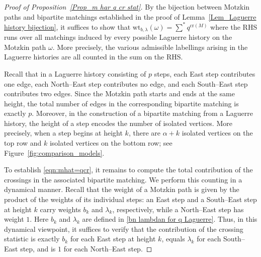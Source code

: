\documentclass{amsart}
\newcommand{\Cr}{\mathrm{cr}}
\theoremstyle{plain}
\theoremstyle{remark}
\numberwithin{equation}{section}
\begin{document}
\begin{proof}[Proof of Proposition~\ref{Prop_m har q cr stat}]
    By the bijection between Motzkin paths and bipartite matchings established in the proof of Lemma~\ref{Lem_Laguerre history bijection}, it suffices to show that $\mathrm{wt}_{b,\lambda}(\omega)=\sum^* q^{\Cr(M)}$ where the RHS runs over all matchings induced by every possible Laguerre history on the Motzkin path $\omega$. More precisely, the various admissible labellings arising in the Laguerre histories are all counted in the sum on the RHS.
    
   Recall that in a Laguerre history consisting of $p$ steps, each East step contributes one edge, each North–East step contributes no edge, and each South–East step contributes two edges.  Since the Motzkin path starts and ends at the same height, the total number of edges in the corresponding bipartite matching is exactly $p$. Moreover, in the construction of a bipartite matching from a Laguerre history, the height of a step encodes the number of isolated vertices. More precisely, when a step begins at height $k$, there are $\alpha + k$ isolated vertices on the top row and $k$ isolated vertices on the bottom row; see Figure~\ref{fig:comparison_models}.

To establish \eqref{eqn:mhat=qcr}, it remains to compute the total contribution of the crossings in the associated bipartite matching.  
We perform this counting in a dynamical manner.  
Recall that the weight of a Motzkin path is given by the product of the weights of its individual steps: an East step and a South–East step at height $k$ carry weights $b_{k}$ and $\lambda_{k}$, respectively, while a North–East step has weight $1$.  
Here $b_{k}$ and $\lambda_{k}$ are defined in \eqref{bn lambdan for q Laguerre}.  
Thus, in this dynamical viewpoint, it suffices to verify that the contribution of the crossing statistic is exactly $b_k$ for each East step at height $k$, equals $\lambda_{k}$ for each South–East step, and is $1$ for each North–East step.



\end{proof}
\end{document}

